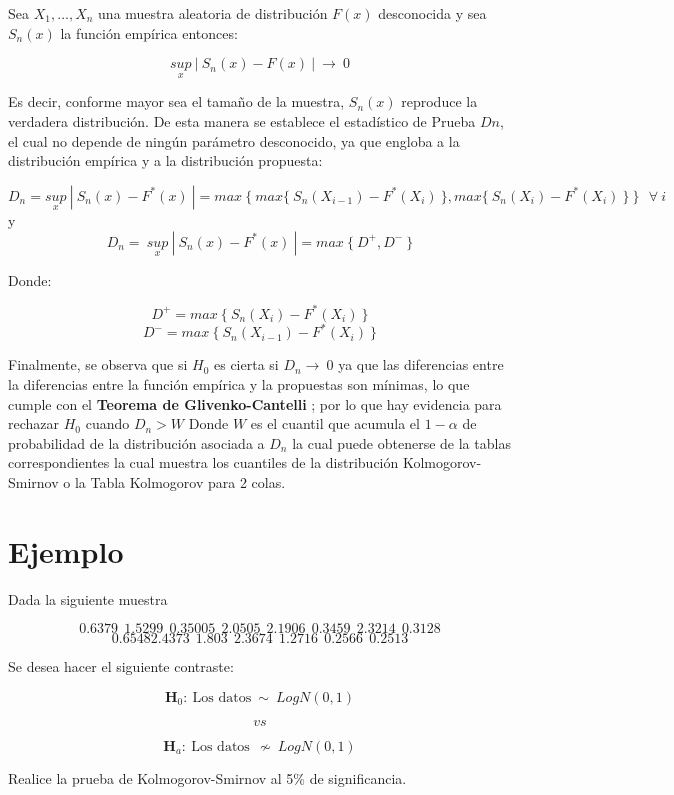 \documentclass[
  a4paper,
  oneside,
  openany]{book}
\begin{document}
Sea \(X_{1},\ldots,X_{n}\) una muestra aleatoria de distribución \(F(x)\) desconocida y sea \(S_{n}(x)\) la función empírica entonces:

\[\underset{x}{sup} \ |\ S_{n}(x)-F(x) \ | \ \longrightarrow \ 0\]

Es decir, conforme mayor sea el tamaño de la muestra, \(S_{n}(x)\) reproduce la verdadera
distribución. De esta manera se establece el estadístico de Prueba \(Dn\), el cual no depende de ningún
parámetro desconocido, ya que engloba a la distribución empírica y a la distribución propuesta:

\[D_{n}=\underset{x}{sup} \ | \ S_{n}(x)-F^*(x) \ |=max \  \{ \ max \{ \  S_{n}(X_{i-1})-F^*(X_{i}) \ \},max \{ \  S_{n}(X_{i})-F^*(X_{i}) \ \} \ \} \ \  \ \forall \ i\]
y \[D_{n}= \ \underset{x}{sup} \ | \ S_{n}(x)-F^*(x) \ |=max \ \{ \  D^+,D^- \ \}\]

Donde:

\[D^+= max \ \{ \  S_{n}(X_{i})-F^*(X_{i}) \ \}\]
\[D^-= max \  \{ \ S_{n}(X_{i-1})-F^*(X_{i}) \ \}\]

Finalmente, se observa que si \(H_0\) es cierta si \(D_{n} \longrightarrow \ 0\) ya que las diferencias entre la diferencias entre la función empírica y la propuestas son mínimas, lo que cumple con el \textbf{Teorema de Glivenko-Cantelli} ; por lo que hay evidencia para rechazar \(H_0\) cuando \(D_{n} > W\) Donde \(W\) es el cuantil que acumula el \(1- \alpha\) de probabilidad de la distribución asociada a \(D_{n}\) la cual puede obtenerse de la tablas correspondientes la cual muestra los cuantiles de la distribución
Kolmogorov-Smirnov o la Tabla Kolmogorov para 2 colas.

\hypertarget{ejemplo-13}{%
\section{Ejemplo}\label{ejemplo-13}}

Dada la siguiente muestra

\[0.6379 \ \ 1.5299 \ \ 0.35005 \ \ 2.0505 \ \ 2.1906 \ \ 0.3459 \ \ 2.3214 \ \ 0.3128\]
\[ 0.65482.4373 \ \ 1.803 \ \ 2.3674 \ \ 1.2716 \ \ 0.2566 \ \ 0.2513\]

Se desea hacer el siguiente contraste:

\[\textbf{H}_0: \ \mbox{Los datos} \  \sim  \ LogN(0,1)\]

\[vs\]

\[\textbf{H}_a: \ \mbox{Los datos} \ \ \nsim \ LogN(0,1)\]

Realice la prueba de Kolmogorov-Smirnov al 5\% de significancia.
\end{document}
